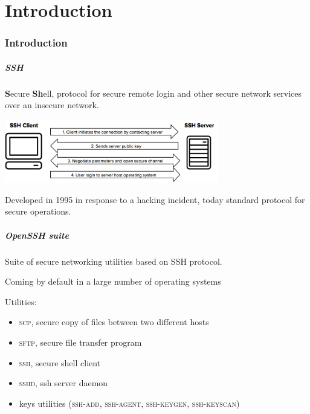 \part{Introduction}
\section{Introduction}

\begin{frame}
	\partpage
\end{frame}

\begin{frame}
	\frametitle{SSH}
	
	\textbf{S}ecure \textbf{Sh}ell, protocol for secure remote login and other secure network services over an insecure network. 
	
	\smallskip
	
	\begin{center}    
  \includegraphics[width=0.7\textwidth]{images/ssh}
  \end{center}

	\smallskip
	
	Developed in 1995 in response to a hacking incident, today standard protocol for secure operations.


\end{frame}


\begin{frame}
	\frametitle{OpenSSH suite}
		
	Suite of secure networking utilities based on SSH protocol.
	
	\medskip
	
	Coming by default in a large number of operating systems
	
	\medskip
		
	Utilities:
	
	\begin{itemize}
	  \item \textsc{scp}, secure copy of files between two different hosts
	  \item \textsc{sftp}, secure file transfer program
	  \item \textsc{ssh}, secure shell client
	  \item \textsc{sshd}, ssh server daemon
	  \item keys utilities (\textsc{ssh-add}, \textsc{ssh-agent}, \textsc{ssh-keygen}, \textsc{ssh-keyscan})
	\end{itemize}

\end{frame}


